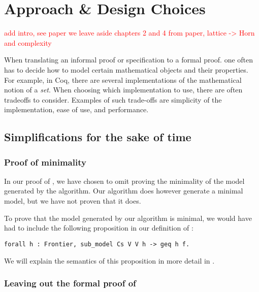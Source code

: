 \chapter{Approach \& Design Choices}
\label{ch:approach_design_choices}

\textcolor{red}{add intro, see paper}
\textcolor{red}{we leave aside chapters 2 and 4 from paper, lattice -> Horn and complexity}

When translating an informal proof or specification to a formal proof.
one often has to decide how to model certain mathematical objects and their properties.
For example, in Coq, there are several implementations of the mathematical notion of a \textit{set}.
When choosing which implementation to use, there are often tradeoffs to consider.
Examples of such trade-offs are simplicity of the implementation, ease of use, and performance.

\section{Simplifications for the sake of time}
\label{sec:simplifications}

\subsection{Proof of minimality}
\label{ssec:proof_of_minimality}

In our proof of , we have chosen to omit proving the minimality of the model generated by the algorithm.
Our algorithm does however generate a minimal model, but we have not proven
that it does.

To prove that the model generated by our algorithm is minimal,
we would have had to include the following proposition in our definition of :

\begin{minipage}{\linewidth}
\begin{lstlisting}[language=Coq, label={lst:minimal_model}, caption={Proposition for minimal model}]
forall h : Frontier, sub_model Cs V V h -> geq h f.
\end{lstlisting}
\end{minipage}

We will explain the semantics of this proposition in more detail in .

\subsection{Leaving out the formal proof of }
\label{ssec:leaving_out_the_formal_proof_of_lem_33}

